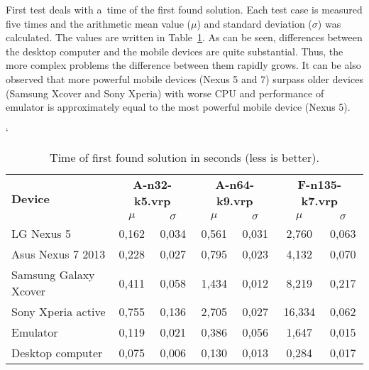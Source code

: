 First test deals with a~time of the first found solution. Each test case is measured five times and the arithmetic mean
value ($\mu$) and standard deviation ($\sigma$) was calculated. The values are written in Table~\ref{FirstFoundTable}.
As can be seen, differences between the desktop computer and the mobile devices are quite substantial. Thus, the more
complex problems the difference between them rapidly grows. It can be also observed that more powerful mobile devices
(Nexus 5 and 7) surpass older devices (Samsung Xcover and Sony Xperia) with worse CPU and performance of emulator is
approximately equal to the most powerful mobile device (Nexus 5).
\\
\begin{table}[h!]
    \catcode`
    \begin{tabular}{|l|c|c|c|c|c|c|}
        \hline
        \multirow{2}{*}{\textbf{Device}} &
        \multicolumn{2}{c|}{\textbf{A-n32-k5.vrp}} &
        \multicolumn{2}{c|}{\textbf{A-n64-k9.vrp}} &
        \multicolumn{2}{c|}{\textbf{F-n135-k7.vrp}} \\ \cline{2-7}
        & $\mu$ & $\sigma$ & $\mu$ & $\sigma$ & $\mu$ & $\sigma$ \\ \hline \hline
        LG Nexus 5            & 0,162 & 0,034 & 0,561 & 0,031 & 2,760  & 0,063 \\ \hline
        Asus Nexus 7 2013     & 0,228 & 0,027 & 0,795 & 0,023 & 4,132  & 0,070 \\ \hline
        Samsung Galaxy Xcover & 0,411 & 0,058 & 1,434 & 0,012 & 8,219  & 0,217 \\ \hline
        Sony Xperia active    & 0,755 & 0,136 & 2,705 & 0,027 & 16,334 & 0,062 \\ \hline
        Emulator              & 0,119 & 0,021 & 0,386 & 0,056 & 1,647  & 0,015 \\ \hline
        Desktop computer      & 0,075 & 0,006 & 0,130 & 0,013 & 0,284  & 0,017 \\ \hline
    \end{tabular}
    \centering
    \caption{Time of first found solution in seconds (less is better).}
    \label{FirstFoundTable}
\end{table}

